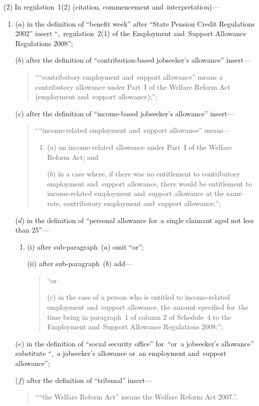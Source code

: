 \documentclass[12pt,a4paper]{article}
\begin{document}
(2) In regulation~1(2) (citation, commencement and~interpretation)—
\begin{enumerate}\item[]
($a$) in the definition of “benefit week” after “State Pension Credit Regulations 2002” insert “,~regulation~2(1) of the Employment and~Support Allowance Regulations 2008”;

($b$) after the definition of “contribution-based jobseeker’s allowance” insert—
\begin{quotation}
““contributory employment and~support allowance” means a contributory allowance under Part~I of the Welfare Reform Act (employment and~support allowance);”;
\end{quotation}

($c$) after the definition of “income-based jobseeker’s allowance” insert—
\begin{quotation}
\begin{sloppypar}
““income-related employment and~support allowance” means—
\end{sloppypar}
\begin{enumerate}\item[]
($a$) 
an income-related allowance under Part~I of the Welfare Reform Act; and

($b$) 
in a case where, if there was no entitlement to contributory employment and~support allowance, there would be entitlement to income-related employment and~support allowance at the same rate, contributory employment and~support allowance;”;
\end{enumerate}
\end{quotation}

($d$) in the definition of “personal allowance for~a single claimant aged not less than 25”—
\begin{enumerate}\item[]
(i) after sub-paragraph~($a$)  omit “or”;

(ii) after sub-paragraph~($b$)  add—
\begin{quotation}
“or

($c$) in the case of a person who is entitled to income-related employment and~support allowance, the amount specified for~the time being in paragraph~1 of column 2 of Schedule~4 to the Employment and~Support Allowance Regulations 2008;”;
\end{quotation}
\end{enumerate}

($e$) in the definition of “social security office” for~“or~a jobseeker’s allowance” substitute “,~a jobseeker’s allowance or~an employment and~support allowance”;

($f$) after the definition of “tribunal” insert—
\begin{quotation}
““the Welfare Reform Act” means the Welfare Reform Act 2007.”.
\end{quotation}
\end{enumerate}
\end{document}
